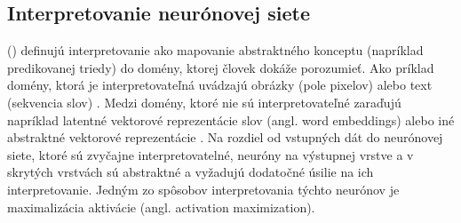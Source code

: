 








\subsection{Interpretovanie neurónovej siete}

\citeauthor{montavon2018methods} (\citeyear{montavon2018methods}) definujú interpretovanie ako mapovanie abstraktného konceptu (napríklad predikovanej triedy) do domény, ktorej človek dokáže porozumieť. Ako príklad domény, ktorá je interpretovateľná uvádzajú obrázky (pole pixelov) alebo text (sekvencia slov) \cite{montavon2018methods}. Medzi domény, ktoré nie sú interpretovateľné zaraďujú napríklad latentné vektorové reprezentácie slov (angl. word embeddings) alebo iné abstraktné vektorové reprezentácie \cite{montavon2018methods}.
Na rozdiel od vstupných dát do neurónovej siete, ktoré sú zvyčajne interpretovatelné, neuróny na výstupnej vrstve a v skrytých vrstvách sú abstraktné a vyžadujú dodatočné úsilie na ich interpretovanie. Jedným zo spôsobov interpretovania týchto neurónov je maximalizácia aktivácie (angl. activation maximization).

